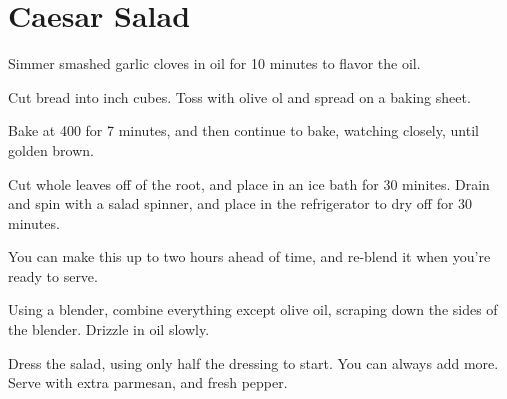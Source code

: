 \section{Caesar Salad}
\begin{recipe}



Simmer smashed garlic cloves in oil for 10 minutes to flavor the oil.

Cut bread into  inch cubes. Toss with olive ol and spread on a baking sheet.

Bake at 400\degree{} for 7 minutes, and then continue to bake, watching closely, until golden brown.


Cut whole leaves off of the root, and place in an ice bath for 30 minites. Drain and spin with a salad spinner, and place in the refrigerator to dry off for 30 minutes.


You can make this up to two hours ahead of time, and re-blend it when you're ready to serve. 

Using a blender, combine everything except olive oil, scraping down the sides of the blender. Drizzle in oil slowly.

Dress the salad, using only half the dressing to start. You can always add more. Serve with extra parmesan, and fresh pepper. 

\end{recipe}

